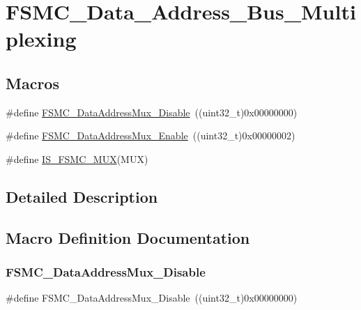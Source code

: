 \hypertarget{group___f_s_m_c___data___address___bus___multiplexing}{}\section{F\+S\+M\+C\+\_\+\+Data\+\_\+\+Address\+\_\+\+Bus\+\_\+\+Multiplexing}
\label{group___f_s_m_c___data___address___bus___multiplexing}
\subsection*{Macros}
\begin{DoxyCompactItemize}
\item 
\#define \mbox{\hyperlink{group___f_s_m_c___data___address___bus___multiplexing_ga62d92adbcbcc1d6ec9a04de1b343744a}{F\+S\+M\+C\+\_\+\+Data\+Address\+Mux\+\_\+\+Disable}}~((uint32\+\_\+t)0x00000000)
\item 
\#define \mbox{\hyperlink{group___f_s_m_c___data___address___bus___multiplexing_ga1dd4d12e63aaf29dbb8ae4b613f2aa15}{F\+S\+M\+C\+\_\+\+Data\+Address\+Mux\+\_\+\+Enable}}~((uint32\+\_\+t)0x00000002)
\item 
\#define \mbox{\hyperlink{group___f_s_m_c___data___address___bus___multiplexing_ga546fcab8c1b751b4a959ba2ce5b35d79}{I\+S\+\_\+\+F\+S\+M\+C\+\_\+\+M\+UX}}(M\+UX)
\end{DoxyCompactItemize}


\subsection{Detailed Description}


\subsection{Macro Definition Documentation}
\mbox{\label{group___f_s_m_c___data___address___bus___multiplexing_ga62d92adbcbcc1d6ec9a04de1b343744a}} 
\subsubsection{\texorpdfstring{FSMC\_DataAddressMux\_Disable}{FSMC\_DataAddressMux\_Disable}}
{\footnotesize\ttfamily \#define F\+S\+M\+C\+\_\+\+Data\+Address\+Mux\+\_\+\+Disable~((uint32\+\_\+t)0x00000000)}

